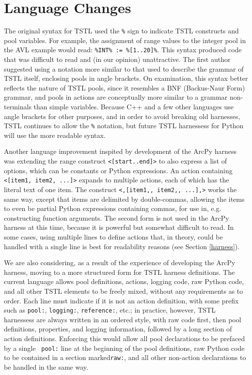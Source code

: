 \section{Language Changes}

The original syntax for TSTL \cite{NFM15} used the {\tt \%} sign to
indicate TSTL constructs and pool variables.  For example, the
assignment of range values to the integer pool in the AVL example
would read:  {\tt \%INT\% := \%[1..20]\%}.  This syntax
produced code that was difficult to read and (in our opinion) unattractive.  The first
author suggested using a notation more similar to that used to
describe the grammar of TSTL itself, enclosing pools in angle
brackets.  On examination, this syntax better reflects the nature of
TSTL pools, since it resembles a BNF (Backus-Naur Form) grammar, and
pools in actions are
conceptually more similar to a grammar non-terminals than simple variables.  Because
C++ and a few other languages use angle brackets for other purposes,
and in order to avoid breaking old harnesses, TSTL continues to allow
the {\tt \%} notation, but future TSTL harnessess for Python will use
the more readable syntax.

Another language improvement inspited by development of the ArcPy harness was
extending the range construct {\tt <[start..end]>} to also express a
list of options, which can be constants or Python expressions.  An
action containing {\tt <[item1, item2, ...]>} expands to multiple
actions, each of which has the literal text of one item.  The
construct {\tt <,[item1,, item2,, ...],>} works the same way, except
that items are delimited by double-commas, allowing the items to even
be partial Python expressions containing commas, for use in,
e.g. constructing function arguments.  The second form is not used in
the ArcPy harness at this time, because it is powerful but somewhat
difficult to read.  In some cases, using multiple lines to define
actions that, in theory, could be handled with a single line is best
for readability reasons (see Section \ref{harness}).

We are also considering, as a result of the experience of developing
the ArcPy harness, moving to a more structured form for TSTL harness definitions.
The current language allows pool definitions, actions, logging code,
raw Python code, and all other TSTL elements to be freely mixed,
without any requirements as to order.  Each line must indicate if it
is not an action definition, with some prefix such as {\tt pool:},
{\tt logging:}, {\tt reference:}, etc.; in practice, however, TSTL
harnessess are always written in an ordered style, with raw code
first, then pool definitions, properties, and logging information,
followed by a long section of action definitions.  Enforcing this
would allow all pool declarations to be prefaced by a single {\tt
  pool:} line at the beginning of the pool definitions, raw Python
code to be contained in a section marked{\tt raw:}, and all other
non-action declarations to be handled in the same way. 


